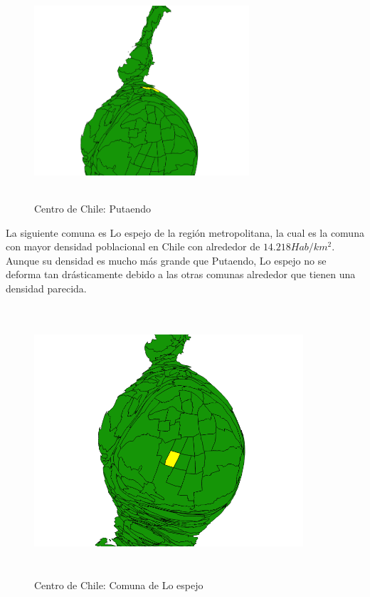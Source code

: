 \documentclass[20pt]{report}
\begin{document}
\begin{itemize}
\begin{figure}[H]
\begin{center}
\includegraphics[width=8cm, height=8cm]{putaendo.png}
\vspace{-0.5cm} %
\caption{Centro de Chile: Putaendo}
\label{Label para referencia}
\end{center}
\end{figure}
\pagebreak

La siguiente comuna es Lo espejo de la regi\'on metropolitana, la cual es la comuna con mayor densidad poblacional en Chile con alrededor de $14.218 Hab/km^2$. Aunque su densidad es mucho m\'as grande que Putaendo, Lo espejo no se deforma tan dr\'asticamente  debido a las otras comunas alrededor que tienen una densidad  parecida.
\begin{figure}[H]
\begin{center}
\includegraphics[width=10cm, height=10cm]{loespejo.png}
\vspace{-0.5cm} %
\caption{Centro de Chile: Comuna de Lo espejo}
\label{Label para referencia}
\end{center}
\end{figure}
\pagebreak


\end{itemize}
\end{document}
